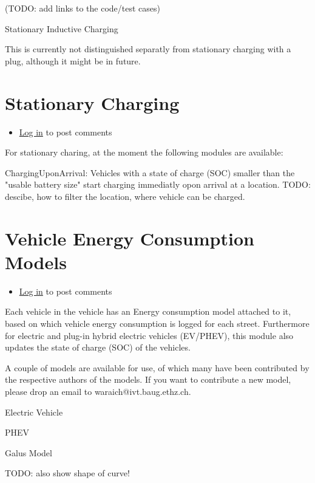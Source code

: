 \documentclass[a4paper,11pt]{report}
\begin{document}
(TODO: add links to the code/test cases)



Stationary Inductive Charging

This is currently not distinguished separatly from stationary charging with a plug, although it might be in future.

\vfill\eject
\section{Stationary Charging}
\begin{itemize}
	\item \href{http://www.matsim.org/user/login?destination=comment/reply/717%23comment-form}{Log in} to post comments
\end{itemize}

For stationary charing, at the moment the following modules are available:

ChargingUponArrival: Vehicles with a state of charge (SOC) smaller  than the "usable battery size" start charging immediatly opon arrival at  a location. TODO: descibe, how to filter the location, where vehicle  can be charged.

\vfill\eject
\section{Vehicle Energy Consumption Models}
\begin{itemize}
	\item \href{http://www.matsim.org/user/login?destination=comment/reply/716%23comment-form}{Log in} to post comments
\end{itemize}

Each  vehicle in the vehicle has an Energy consumption model attached to it,  based on which vehicle energy consumption is logged for each street.  Furthermore for electric and plug-in hybrid electric vehicles (EV/PHEV),  this module also updates the state of charge (SOC) of the vehicles.

A couple of models are available for use, of which many have been  contributed by the respective authors of the models. If you want to  contribute a new model, please drop an email to  waraich@ivt.baug.ethz.ch.

Electric Vehicle



PHEV

Galus Model

TODO: also show shape of curve!
\end{document}
